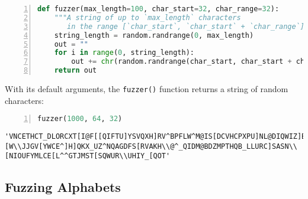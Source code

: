 \documentclass[10pt,parskip=half,
	toc=sectionentrywithdots,
	bibliography=totocnumbered,
	captions=tableheading,numbers=noendperiod]{scrartcl}
\begin{document}
\begin{lstlisting}[language=Python,numbers=left,xleftmargin=20pt,xrightmargin=5pt,belowskip=5pt,aboveskip=5pt]
def fuzzer(max_length=100, char_start=32, char_range=32):
    """A string of up to `max_length` characters 
       in the range [`char_start`, `char_start` + `char_range`]"""
    string_length = random.randrange(0, max_length)
    out = ""
    for i in range(0, string_length):
        out += chr(random.randrange(char_start, char_start + char_range))
    return out
\end{lstlisting}

With its default arguments, the \texttt{fuzzer()} function returns a
string of random characters:

\begin{lstlisting}[language=Python,numbers=left,xleftmargin=20pt,xrightmargin=5pt,belowskip=5pt,aboveskip=5pt]
fuzzer(1000, 64, 32)
\end{lstlisting}

\begin{lstlisting}[language={},postbreak={},numbers=none,xrightmargin=7pt,breakindent=0pt,aboveskip=5pt,belowskip=5pt]
'VNCETHCT_DLORCXT[I@F[[QIFTU]YSVQXH]RV^BPFLW^M@IS[DCVHCPXPU]NL@DIQWIZ]BQUL^LOXQRCYCE^WC^PCJRUAUNXG\\MAKTBGFRI_MRZ]NZJLABPNZC@FULS__]KMBJKFYXMH@XB]XGXEEFHQ^VNVSLLA_HF]_^W]T@RJO^N]UQRZ^[]JLUBXBHJG[_D@NZ@UA@KY@IQLP\\YVJES_V^LZMTX@ZJGCBFXZVNS^@HITIQMEZHIGKGQWDFZ[HL_AENNDK[]LLK[I@GWH^WH]IRMJGGAJJZCGOSQRLZVF\\RVYVHBFZGOU_O]GHTY\\\\MDYZGYIHL^UEYERY\\@HVOJGX]]MPGSWTHBZDWXOIFMEKTKNE]CX[J]WOGGI[NDYGL_XDLEC@JRJPOWMOMXZPOAO_@GICMI^VADUMHXHP\\Y^SUJRXCPQ@HTQBXEAV_YLH_EFKM@L@AGVFAIZZY[\\LXO@]DDUDIRQYLI^YL\\TP^VL^XE]P^BA_@E^LWXG\\XVJGE_P\\DJW][W\\JJGV[YWCE^]H]QKX_UZ^NQAGDFS[RVAKH\\@^_QIDM@BDZMPTHQB_LLURC]SASN\\[NIOUFYMLCE[L^^GTJMST[SQWUR\\UHIY_[QOT'
\end{lstlisting}

\subsection{Fuzzing Alphabets}\label{fuzzing-alphabets}
\end{document}
